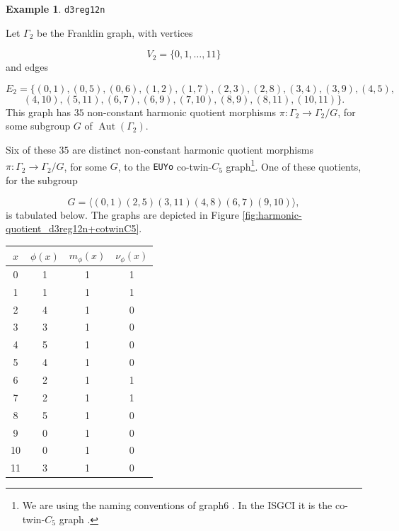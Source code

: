 \documentclass[12pt,letterpaper]{article}
\theoremstyle{definition}
\newtheorem{example}[theorem]{Example}
\DeclareMathOperator{\Aut}{Aut}
\begin{document}
\begin{example}%
\label{example:d3reg12n}
  {\tt d3reg12n}\newline
{\rm  
Let $\Gamma_2$ be the Franklin graph, with vertices

\[
V_2=\{0,1,\dots,11\}
\]
and edges

\[
E_2 = \{
(0, 1), (0, 5), (0, 6), (1, 2), (1, 7), (2, 3), (2, 8), (3, 4), (3, 9), (4, 5), 
\]
\[
(4, 10), (5, 11), (6, 7), (6, 9), (7, 10), (8, 9), (8, 11), (10, 11)
\}.
\]
This graph has $35$ non-constant harmonic quotient
morphisms $\pi: \Gamma_2\to \Gamma_2/G$, for some subgroup
$G$ of $\Aut(\Gamma_2)$.

Six of these $35$ are distinct non-constant harmonic quotient
morphisms $\pi: \Gamma_2\to \Gamma_2/G$, for some $G$,  to
the {\tt EUYo}
co-twin-$C_5$ graph\footnote{We are using the naming conventions
of graph6 \cite{Mc26}. In the ISGCI it is the co-twin-$C_5$ graph
\cite{dR26}.}.
One of these quotients, for the subgroup

\[
G=\langle (0,1)(2,5)(3,11)(4,8)(6,7)(9,10) \rangle,
\]
is tabulated below. The graphs are depicted in
Figure \ref{fig:harmonic-quotient_d3reg12n+cotwinC5}.

\begin{center}
\begin{tabular}{c|c|c|c}  
  $x$ & $\phi(x)$ & $m_\phi(x)$ & $\nu_\phi(x)$ \\ \hline
  0   &    1   &        1         &  1   \\ 
  1   &    1   &        1         &  1  \\ 
  2   &    4   &        1         &  0  \\ 
  3   &    3   &        1         &  0  \\ 
  4   &    5   &        1         &  0   \\ 
  5   &    4   &        1         &  0  \\ 
  6   &    2   &        1         &  1   \\ 
  7   &    2   &        1         &  1   \\
  8   &    5   &        1         &  0   \\
  9   &    0   &        1         &  0   \\
  10  &    0   &        1         &  0   \\
  11  &    3   &        1         &  0   \\ 
\end{tabular}
\end{center}

}
\end{example}
\end{document}
